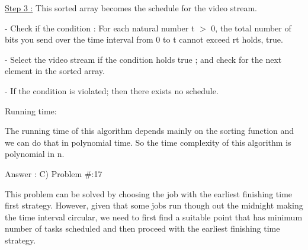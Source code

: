 \documentclass[letterpaper,portrait,12pt]{article}
\begin{document}
\begin{flushleft}

\end{flushleft}


\begin{flushleft}
\uline{Step 3 :} This sorted array becomes the schedule for the video stream.
\end{flushleft}


- Check if the condition : For each natural number t $>$ 0, the total number of bits you send over the time interval from 0 to t cannot exceed rt holds, true.


\begin{flushleft}
- Select the video stream if the condition holds true ; and check for the next element in the sorted 	array.
\end{flushleft}


\begin{flushleft}
- If the condition is violated; then there exists no schedule.
\end{flushleft}


\begin{flushleft}

\end{flushleft}


\begin{flushleft}
Running time:
\end{flushleft}


\begin{flushleft}
	The running time of this algorithm depends mainly on the sorting function and we can do that in polynomial time. So the time complexity of this algorithm is polynomial in n. 
\end{flushleft}


\begin{flushleft}

\end{flushleft}


\begin{flushleft}

\end{flushleft}


\begin{flushleft}
Answer : C) Problem \#:17
\end{flushleft}


\begin{flushleft}

\end{flushleft}


\begin{flushleft}
This problem can be solved by choosing the job with the earliest finishing time first strategy. However, given that some jobs run though out the midnight making the time interval circular, we need to first find a suitable point that has minimum number of tasks scheduled and then proceed with the earliest finishing time strategy.
\end{flushleft}
\end{document}
